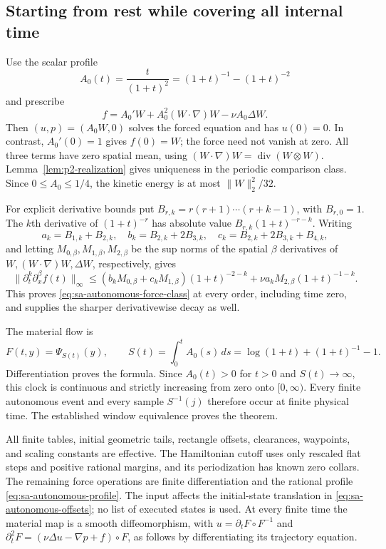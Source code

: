 \subsection{Starting from rest while covering all internal time}
\label{subsec:sa-autonomous-force}
Use the scalar profile
\begin{equation}\label{eq:sa-autonomous-profile}
 A_0(t)=\frac{t}{(1+t)^2}=(1+t)^{-1}-(1+t)^{-2}
\end{equation}
and prescribe
\begin{equation}\label{eq:sa-autonomous-force}
 f=A_0'W+A_0^2(W\cdot\nabla)W-\nu A_0\Delta W.
\end{equation}
Then $(u,p)=(A_0W,0)$ solves the forced equation and has $u(0)=0$.
In contrast, $A_0'(0)=1$ gives $f(0)=W$; the force need not vanish at
zero.  All three terms have zero spatial mean, using
$(W\cdot\nabla)W=\operatorname{div}(W\otimes W)$.
Lemma~\ref{lem:p2-realization} gives uniqueness in the periodic comparison
class.  Since $0\le A_0\le1/4$, the kinetic energy is at most
$\|W\|_2^2/32$.

For explicit derivative bounds put
$B_{r,k}=r(r+1)\cdots(r+k-1)$, with $B_{r,0}=1$.
The $k$th derivative of $(1+t)^{-r}$ has absolute value
$B_{r,k}(1+t)^{-r-k}$.
Writing
\[
 a_k=B_{1,k}+B_{2,k},\quad b_k=B_{2,k}+2B_{3,k},\quad
 c_k=B_{2,k}+2B_{3,k}+B_{4,k},
\]
and letting $M_{0,\beta},M_{1,\beta},M_{2,\beta}$ be the sup norms of
the spatial $\beta$ derivatives of $W,(W\cdot\nabla)W,\Delta W$,
respectively, gives
\[
 \|\partial_t^k\partial_x^\beta f(t)\|_\infty
 \le (b_kM_{0,\beta}+c_kM_{1,\beta})(1+t)^{-2-k}
              +\nu a_kM_{2,\beta}(1+t)^{-1-k}.
\]
This proves \eqref{eq:sa-autonomous-force-class} at every order, including
time zero, and supplies the sharper derivativewise decay as well.

The material flow is
\begin{equation}\label{eq:sa-autonomous-material}
 F(t,y)=\Psi_{S(t)}(y),\qquad
 S(t)=\int_0^t A_0(s)\,ds=\log(1+t)+(1+t)^{-1}-1.
\end{equation}
Differentiation proves the formula.  Since $A_0(t)>0$ for $t>0$ and
$S(t)\to\infty$, this clock is continuous and strictly increasing from
zero onto $[0,\infty)$.  Every finite autonomous event and every sample
$S^{-1}(j)$ therefore occur at finite physical time.  The established
window equivalence proves the theorem.

All finite tables, initial geometric tails, rectangle offsets, clearances,
waypoints, and scaling constants are effective.  The Hamiltonian cutoff
uses only rescaled flat steps and positive rational margins, and its
periodization has known zero collars.  The remaining force operations
are finite differentiation and the rational profile \eqref{eq:sa-autonomous-profile}.
The input affects the initial-state translation in
\eqref{eq:sa-autonomous-offsets}; no list of executed states is used.
At every finite time the material map is a smooth diffeomorphism, with
$u=\partial_tF\circ F^{-1}$ and
$\partial_t^2F=(\nu\Delta u-\nabla p+f)\circ F$, as follows by
 differentiating its trajectory equation.
